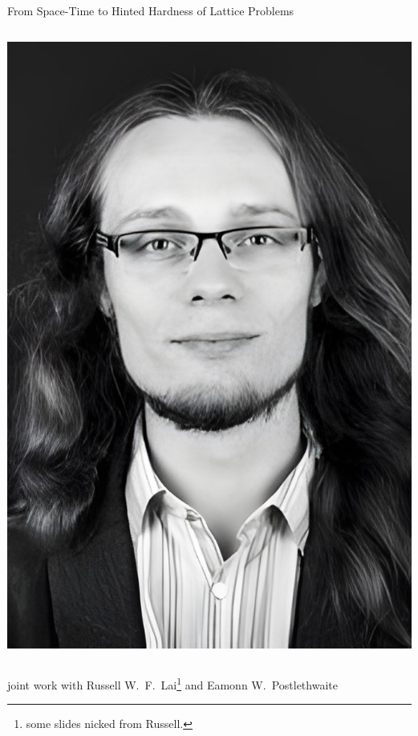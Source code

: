 \documentclass[xcolor=table,10pt,aspectratio=169]{beamer}
\begin{document}
\begin{frame}[label={sec:org42b8277}]{From Space-Time to Hinted Hardness of Lattice Problems}
\begin{columns}
\begin{column}{0.5\columnwidth}
\begin{center}
\includegraphics[keepaspectratio,frame,height=0.6\textheight]{./eamonn.jpg}
\end{center}
\end{column}
\end{columns}

\begin{center}
joint work with Russell W. F. Lai\footnote{some slides nicked from Russell.} and Eamonn W. Postlethwaite
\end{center}
\end{frame}
\end{document}
